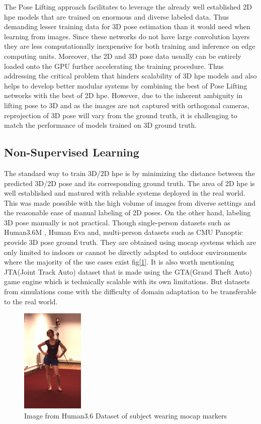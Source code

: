The Pose Lifting approach facilitates to leverage the already well established 2D \ac{hpe} models that are trained on enormous and diverse labeled data. Thus demanding lesser training data for 3D pose estimation than it would need when learning from images. Since these networks do not have large convolution layers they are less computationally inexpensive for both training and inference on edge computing units. Moreover, the 2D and 3D pose data usually can be entirely loaded onto the GPU further accelerating the training procedure. Thus addressing the critical problem that hinders scalability of 3D \ac{hpe} models and also helps to develop better modular systems by combining the best of Pose Lifting networks with the best of 2D \ac{hpe}. However, due to the inherent ambiguity in lifting pose to 3D and as the images are not captured with orthogonal cameras, reprojection of 3D pose will vary from the ground truth, it is challenging to match the performance of models trained on 3D ground truth.

\subsection{Non-Supervised Learning}

The standard way to train 3D/2D \ac{hpe} is by minimizing the distance between the predicted 3D/2D pose and its corresponding ground truth. The area of 2D \ac{hpe} is well established and matured with reliable systems deployed in the real world. This was made possible with the high volume of images from diverse settings and the reasonable ease of manual labeling of 2D poses. On the other hand, labeling 3D pose manually is not practical. Though single-person datasets such as Human3.6M \cite{H3.6}, Human Eva \cite{HumanEva} and, multi-person datasets such as CMU Panoptic \cite{cmuPanoptic} provide 3D pose ground truth. They are obtained using \ac{mocap} systems which are only limited to indoors or cannot be directly adapted to outdoor environments where the majority of the use cases exist fig[\ref{fig:h36_mocap}]. It is also worth mentioning JTA(Joint Track Auto) dataset \cite{JTA} that is made using the GTA(Grand Theft Auto) game engine which is technically scalable with its own limitations. But datasets from simulations come with the difficulty of domain adaptation to be transferable to the real world.

\begin{figure}[!h]
    \centering
    \includegraphics[width=30mm]{figures/h36_mocap.png}
    \caption{Image from Human3.6 Dataset \cite{H3.6} of subject wearing \ac{mocap} markers}
    \label{fig:h36_mocap}
\end{figure}

